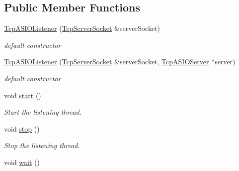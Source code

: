 \subsection*{Public Member Functions}
\begin{DoxyCompactItemize}
\item 
\hyperlink{classmognetwork_1_1_tcp_a_s_i_o_listener_aae7628471fda37905fab2dc03db11f77}{Tcp\-A\-S\-I\-O\-Listener} (\hyperlink{classmognetwork_1_1_tcp_server_socket}{Tcp\-Server\-Socket} \&server\-Socket)
\begin{DoxyCompactList}\small\item\em default constructor \end{DoxyCompactList}\item 
\hyperlink{classmognetwork_1_1_tcp_a_s_i_o_listener_a8bfbba4fd4204b3fb9ff335be8656277}{Tcp\-A\-S\-I\-O\-Listener} (\hyperlink{classmognetwork_1_1_tcp_server_socket}{Tcp\-Server\-Socket} \&server\-Socket, \hyperlink{classmognetwork_1_1_tcp_a_s_i_o_server}{Tcp\-A\-S\-I\-O\-Server} $\ast$server)
\begin{DoxyCompactList}\small\item\em default constructor \end{DoxyCompactList}\item 
\hypertarget{classmognetwork_1_1_tcp_a_s_i_o_listener_afd805699dfe27ceb0541feeefacc13dc}{void \hyperlink{classmognetwork_1_1_tcp_a_s_i_o_listener_afd805699dfe27ceb0541feeefacc13dc}{start} ()}\label{classmognetwork_1_1_tcp_a_s_i_o_listener_afd805699dfe27ceb0541feeefacc13dc}

\begin{DoxyCompactList}\small\item\em Start the listening thread. \end{DoxyCompactList}\item 
\hypertarget{classmognetwork_1_1_tcp_a_s_i_o_listener_ac9952961dce0f44bc720485a4e4e620d}{void \hyperlink{classmognetwork_1_1_tcp_a_s_i_o_listener_ac9952961dce0f44bc720485a4e4e620d}{stop} ()}\label{classmognetwork_1_1_tcp_a_s_i_o_listener_ac9952961dce0f44bc720485a4e4e620d}

\begin{DoxyCompactList}\small\item\em Stop the listening thread. \end{DoxyCompactList}\item 
\hypertarget{classmognetwork_1_1_tcp_a_s_i_o_listener_ae6327f6471291ba5107c0a9c3362b929}{void \hyperlink{classmognetwork_1_1_tcp_a_s_i_o_listener_ae6327f6471291ba5107c0a9c3362b929}{wait} ()}\label{classmognetwork_1_1_tcp_a_s_i_o_listener_ae6327f6471291ba5107c0a9c3362b929}


\end{DoxyCompactItemize}
